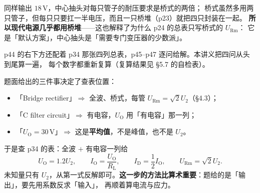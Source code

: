 \documentclass[11pt]{ctexart}
\begin{document}
同样输出 $18\,\mathrm{V}$，中心抽头对每只管子的耐压要求是桥式的两倍；
桥式虽然多用两只管子，但每只只要扛一半电压，而且一只桥堆（p23）就把四只封装在一起。
\textbf{所以现代电源几乎都用桥堆}——这也解释了为什么 p24 的总表只写桥式的 $U_{\mathrm{Rm}}$：
它是「默认方案」，中心抽头是「需要专门变压器的少数派」。





p44 的右下方还配着 p34 那张四列总表，p45--p47 逐问给解。本讲义把四问从头到尾算一遍，
每个数字都重新复算（复算结果见 §5.7 的自检表）。


题面给出的三件事决定了查表位置：
\begin{itemize}
\item 「Bridge rectifier」$\Rightarrow$ 全波、桥式，每管 $U_{\mathrm{Rm}}=\sqrt2U_2$（§4.3）；
\item 「C filter circuit」$\Rightarrow$ 有电容，$U_{\mathrm{O}}$ 用「有电容」那一列；
\item 「$U_{\mathrm{O}}=30\,\mathrm{V}$」$\Rightarrow$ 这是\textbf{平均值}，不是峰值，也不是 $U_2$。
\end{itemize}
于是查 p34 的表：全波 $+$ 有电容一列给
\[ U_{\mathrm{O}}=1.2U_2 ,\qquad I_{\mathrm{O}}=\frac{U_{\mathrm{O}}}{R_{\mathrm{L}}},\qquad
I_{\mathrm{D}}=\frac12I_{\mathrm{O}},\qquad U_{\mathrm{Rm}}=\sqrt2U_2 . \]
未知量只有 $U_2$，从第一式反解即可。\textbf{这一步的方法比算术重要}：题给的是「输出」，要先用系数反求「输入」，
再顺着算电流与应力。

\end{document}

